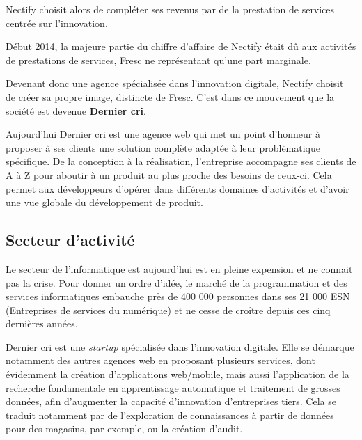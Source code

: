 \documentclass[12pt,a4paper]{article}
\begin{document}
  \bigskip

  Nectify choisit alors de compléter ses revenus par de la prestation de
  services centrée sur l'innovation.

  \bigskip

  Début 2014, la majeure partie du chiffre d'affaire de Nectify était dû
  aux activités de prestations de services, Fresc ne représentant qu'une
  part marginale.

  \bigskip

  Devenant donc une agence spécialisée dans l'innovation digitale, Nectify
  choisit de créer sa propre image, distincte de Fresc. C'est dans ce
  mouvement que la société est devenue \textbf{Dernier cri}.

  \bigskip

  Aujourd'hui Dernier cri est une agence web qui met un point d'honneur à
  proposer à ses clients une solution complète adaptée à leur
  problèmatique spécifique. De la conception à la réalisation,
  l'entreprise accompagne ses clients de A à Z pour aboutir à un produit
  au plus proche des besoins de ceux-ci. Cela permet aux développeurs
  d'opérer dans différents domaines d'activités et d'avoir une vue globale
  du développement de produit.

  \bigskip

  \subsection{Secteur d'activité}\label{secteur-dactivituxe9}

  \bigskip

  Le secteur de l'informatique est aujourd'hui est en pleine expension et
  ne connait pas la crise. Pour donner un ordre d'idée, le marché de la
  programmation et des services informatiques embauche près de 400 000
  personnes dans ses 21 000 ESN (Entreprises de services du numérique) et
  ne cesse de croître depuis ces cinq dernières années.

  \bigskip

  Dernier cri est une \emph{startup} spécialisée dans l'innovation
  digitale. Elle se démarque notamment des autres agences web en proposant
  plusieurs services, dont évidemment la création d'applications
  web/mobile, mais aussi l'application de la recherche fondamentale en
  apprentissage automatique et traitement de grosses données, afin
  d'augmenter la capacité d'innovation d'entreprises tiers. Cela se
  traduit notamment par de l'exploration de connaissances à partir de
  données pour des magasins, par exemple, ou la création d'audit.
\end{document}
